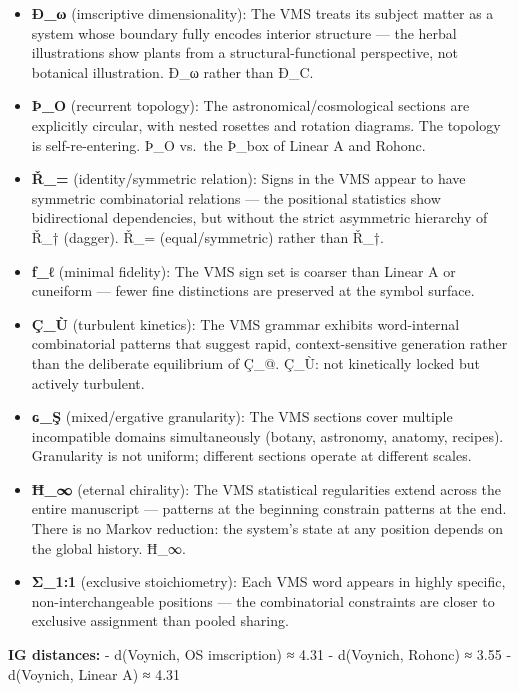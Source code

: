\documentclass[
  11pt,
  a4paper,
]{article}
\providecommand{\tightlist}{%
  \setlength{\itemsep}{0pt}\setlength{\parskip}{0pt}}
\begin{document}
\begin{itemize}
\tightlist
\item
  \textbf{Ð\_ω} (imscriptive dimensionality): The VMS treats its subject
  matter as a system whose boundary fully encodes interior structure ---
  the herbal illustrations show plants from a structural-functional
  perspective, not botanical illustration. Ð\_ω rather than Ð\_C.
\item
  \textbf{Þ\_O} (recurrent topology): The astronomical/cosmological
  sections are explicitly circular, with nested rosettes and rotation
  diagrams. The topology is self-re-entering. Þ\_O vs.~the Þ\_box of
  Linear A and Rohonc.
\item
  \textbf{Ř\_=} (identity/symmetric relation): Signs in the VMS appear
  to have symmetric combinatorial relations --- the positional
  statistics show bidirectional dependencies, but without the strict
  asymmetric hierarchy of Ř\_† (dagger). Ř\_= (equal/symmetric) rather
  than Ř\_†.
\item
  \textbf{ƒ\_ℓ} (minimal fidelity): The VMS sign set is coarser than
  Linear A or cuneiform --- fewer fine distinctions are preserved at the
  symbol surface.
\item
  \textbf{Ç\_Ù} (turbulent kinetics): The VMS grammar exhibits
  word-internal combinatorial patterns that suggest rapid,
  context-sensitive generation rather than the deliberate equilibrium of
  Ç\_@. Ç\_Ù: not kinetically locked but actively turbulent.
\item
  \textbf{ɢ\_Ş} (mixed/ergative granularity): The VMS sections cover
  multiple incompatible domains simultaneously (botany, astronomy,
  anatomy, recipes). Granularity is not uniform; different sections
  operate at different scales.
\item
  \textbf{Ħ\_∞} (eternal chirality): The VMS statistical regularities
  extend across the entire manuscript --- patterns at the beginning
  constrain patterns at the end. There is no Markov reduction: the
  system's state at any position depends on the global history. Ħ\_∞.
\item
  \textbf{Σ\_1:1} (exclusive stoichiometry): Each VMS word appears in
  highly specific, non-interchangeable positions --- the combinatorial
  constraints are closer to exclusive assignment than pooled sharing.
\end{itemize}

\textbf{IG distances:} - d(Voynich, OS imscription) ≈ 4.31 - d(Voynich,
Rohonc) ≈ 3.55 - d(Voynich, Linear A) ≈ 4.31
\end{document}
